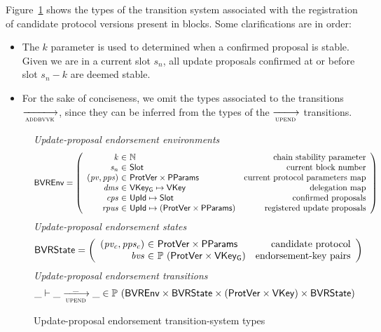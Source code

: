 Figure~\ref{fig:ts-types:up-end} shows the types of the transition system
associated with the registration of candidate protocol versions present in
blocks. Some clarifications are in order:
\begin{itemize}
\item The $k$ parameter is used to determined when a confirmed proposal is
  stable. Given we are in a current slot $s_n$, all update proposals confirmed
  at or before slot $s_n - k$ are deemed stable.
\item For the sake of conciseness, we omit the types associated to the
  transitions $\trans{addbvvk}{}$, since they can be inferred from the types of
  the $\trans{upend}{}$ transitions.
\end{itemize}

\begin{figure}[htb]
  \emph{Update-proposal endorsement environments}
  \begin{align*}
    & \BVREnv
      = \left(
      \begin{array}{r@{~\in~}lr}
        \var{k} & \mathbb{N} & \text{chain stability parameter}\\
        \var{s_n} & \Slot & \text{current block number}\\
        (\var{pv}, \var{pps}) & \ProtVer \times \PPMMap
                             & \text{current protocol parameters map}\\
        \var{dms} & \VKeyGen \mapsto \VKey & \text{delegation map}\\
        \var{cps} & \UPropId \mapsto \Slot & \text{confirmed proposals}\\
        \var{rpus} & \UPropId \mapsto (\ProtVer \times \PPMMap)
                             & \text{registered update proposals}\\
      \end{array}\right)
  \end{align*}
  \emph{Update-proposal endorsement states}
  \begin{align*}
    & \BVRState
      = \left(
      \begin{array}{r@{~\in~}lr}
        (\var{pv_c}, \var{pps_c}) & \ProtVer \times \PPMMap
        & \text{candidate protocol}\\
        \var{bvs} & \powerset{(\ProtVer \times \VKeyGen)}
        & \text{endorsement-key pairs}
      \end{array}\right)
  \end{align*}
  \emph{Update-proposal endorsement transitions}
    \begin{equation*}
    \_ \vdash \_ \trans{upend}{\_} \_ \in
    \powerset (\BVREnv \times \BVRState
    \times (\ProtVer \times \VKey) \times \BVRState)
    \end{equation*}
  \caption{Update-proposal endorsement transition-system types}
  \label{fig:ts-types:up-end}
\end{figure}

